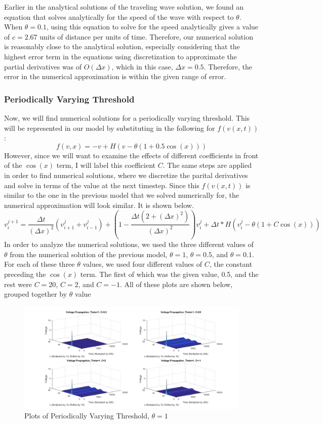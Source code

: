 \documentclass[12pt]{article}
\begin{document}
Earlier in the analytical solutions of the traveling wave solution, we found an equation that solves analytically for the speed of the wave with respect to $\theta$. When $\theta=0.1$, using this equation to solve for the speed analytically gives a value of $c=2.67$ units of distance per units of time. Therefore, our numerical solution is reasonably close to the analytical solution, especially considering that the highest error term in the equations using discretization to approximate the partial derivatives was of $O(\Delta{x})$, which in this case, $\Delta{x}=0.5$. Therefore, the error in the numerical approximation is within the given range of error. 




\subsubsection{Periodically Varying Threshold}
Now, we will find numerical solutions for a periodically varying threshold. This will be represented in our model by substituting in the following for $f(v(x,t))$:
\[f(v,x)=-v+H(v-\theta(1+0.5\cos(x)))\]
However, since we will want to examine the effects of different coefficients in front of the $\cos(x)$ term, I will label this coefficient $C$. The same steps are applied in order to find numerical solutions, where we discretize the parital derivatives and solve in terms of the value at the next timestep. Since this $f(v(x,t))$ is similar to the one in the previous model that we solved numerically for, the numerical approximation will look similar. It is shown below. 
\begin{equation} \label{***}
v^{j+1}_i=\frac{\Delta{t}}{(\Delta{x})^2}(v^{j}_{i+1}+v^{j}_{i-1})+(1-\frac{\Delta{t}(2+(\Delta{x})^2)}{(\Delta{x})^2})v^{j}_{i}+\Delta{t}*H(v^j_i-\theta(1+C\cos(x)))
\end {equation}
In order to analyze the numerical solutions, we used the three different values of $\theta$ from the numerical solution of the previous model, $\theta=1$, $\theta=0.5$, and $\theta=0.1$. For each of these three $\theta$ values, we used four different values of $C$, the constant preceding the $\cos(x)$ term. The first of which was the given value, 0.5, and the rest were $C=20$, $C=2$, and $C=-1$. All of these plots are shown below, grouped together by $\theta$ value
\begin{figure}[H]
  \includegraphics[width=\linewidth]{thetaone3.jpg}
  \caption{Plots of Periodically Varying Threshold, $\theta=1$}
  \label{fig:sketch7}
\end{figure}
\end{document}
